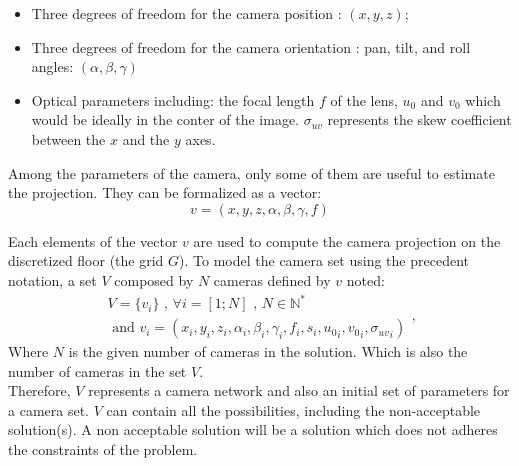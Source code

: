\begin{itemize}
\item Three degrees of freedom for the camera position : $(x, y, z)$;
\item Three degrees of freedom for the camera orientation : pan, tilt, and roll angles: $(\alpha,\beta, \gamma)$ 
\item Optical parameters including: the focal length $f$ of the lens, %
 $u_{0}$ and $v_0 $  which would be ideally in the conter of the image. $\sigma_{uv}$ represents the skew coefficient between the $x$ and the $y$ axes.
\end{itemize}

Among the parameters of the camera, only  some of them are useful to estimate the projection. They can be formalized as a vector:
\begin{equation}\label{eq:v}
v=(x,y,z,\alpha ,\beta,\gamma,f)%
\end{equation}

Each elements of the vector $v$ are used to compute the camera projection on the discretized floor (the grid $G$). 
\iffalse 
To model the camera set using the precedent notation, a set $V$ composed by $N$ cameras defined by $v$ noted:
\begin{equation}\label{eq:V}
\begin{split}
V= \{v_i\} \mbox{  , } \forall i=[1;N] \mbox{ , } N\in \mathbb{N}^*
\\
\mbox{ and } v_i= (x_i,y_i,z_i,\alpha_i ,\beta_i,\gamma_i,f_i,s_i,{u_0}_i,{v_0}_i,{\sigma_{uv}}_i)
\end{split},
\end{equation}
\noindent Where $N$ is the given number of cameras in the solution. Which is also the number of cameras in the set $V$. \\
Therefore, $V$ represents a camera network and also an initial set of parameters for a camera set. $V$ can contain all the possibilities, including the non-acceptable solution(s). A non acceptable  solution will be a solution which  does not adheres the constraints of the problem. \\ 


